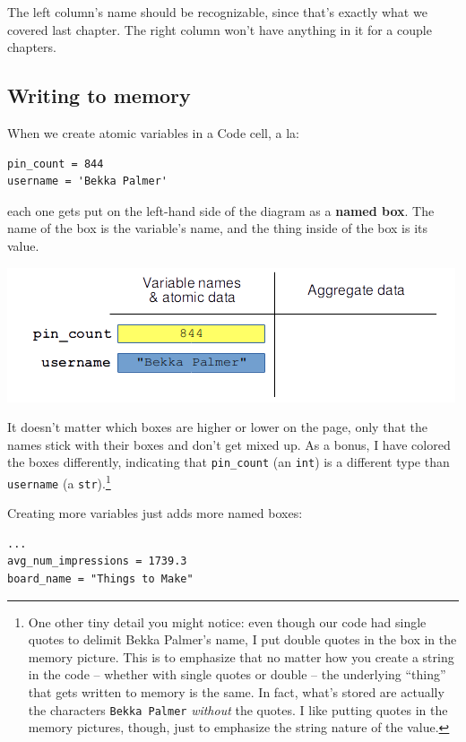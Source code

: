 The left column's name should be recognizable, since that's exactly what we
covered last chapter. The right column won't have anything in it for a couple
chapters.

\subsection{Writing to memory}

When we create atomic variables in a Code cell, a la:

\begin{Verbatim}[fontsize=\small,samepage=true,frame=single,framesep=3mm]
pin_count = 844
username = 'Bekka Palmer'
\end{Verbatim}

each one gets put on the left-hand side of the diagram as a \textbf{named box}.
The name of the box is the variable's name, and the thing inside of the box is
its value.

\vspace{-.2in}
\begin{center}
\includegraphics[width=.8\textwidth]{memoryPicture2.png}
\end{center}

It doesn't matter which boxes are higher or lower on the page, only that the
names stick with their boxes and don't get mixed up. As a bonus, I have colored
the boxes differently, indicating that \texttt{pin\_count} (an \texttt{int}) is
a different type than \texttt{username} (a \texttt{str}).\footnote{One other
tiny detail you might notice: even though our code had single quotes to delimit
Bekka Palmer's name, I put double quotes in the box in the memory picture. This
is to emphasize that no matter how you create a string in the code -- whether
with single quotes or double -- the underlying ``thing'' that gets written to
memory is the same. In fact, what's stored are actually the characters
\texttt{Bekka Palmer} \textit{without} the quotes. I like putting quotes in the
memory pictures, though, just to emphasize the string nature of the value.}

Creating more variables just adds more named boxes:

\begin{Verbatim}[fontsize=\small,samepage=true,frame=single,framesep=3mm]
...
avg_num_impressions = 1739.3
board_name = "Things to Make"
\end{Verbatim}

